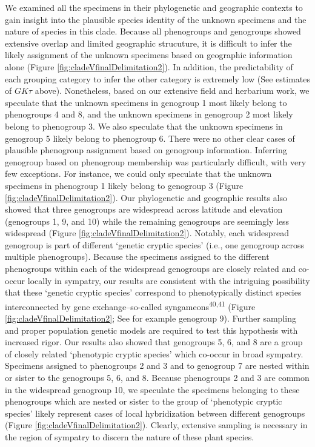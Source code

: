 \documentclass[
  11pt,
]{article}
\begin{document}
We examined all the specimens in their phylogenetic and geographic contexts to gain insight into the plausible species identity of the unknown specimens and the nature of species in this clade. Because all phenogroups and genogroups showed extensive overlap and limited geographic strucuture, it is difficult to infer the likely assignment of the unknown specimens based on geographic information alone (Figure \ref{fig:cladeVfinalDelimitation2}). In addition, the predictability of each grouping category to infer the other category is extremely low (See estimates of \(GK\tau\) above). Nonetheless, based on our extensive field and herbarium work, we speculate that the unknown specimens in genogroup 1 most likely belong to phenogroups 4 and 8, and the unknown specimens in genogroup 2 most likely belong to phenogroup 3. We also speculate that the unknown specimens in genogroup 5 likely belong to phenogroup 6. There were no other clear cases of plausible phenogroup assignment based on genogroup information. Inferring genogroup based on phenogroup membership was particularly difficult, with very few exceptions. For instance, we could only speculate that the unknown specimens in phenogroup 1 likely belong to genogroup 3 (Figure \ref{fig:cladeVfinalDelimitation2}). Our phylogenetic and geographic results also showed that three genogroups are widespread across latitude and elevation (genogroups 1, 9, and 10) while the remaining genogroups are seemingly less widespread (Figure \ref{fig:cladeVfinalDelimitation2}). Notably, each widespread genogroup is part of different `genetic cryptic species' (i.e., one genogroup across multiple phenogroups). Because the specimens assigned to the different phenogroups within each of the widespread genogroups are closely related and co-occur locally in sympatry, our results are consistent with the intriguing possibility that these `genetic cryptic species' correspond to phenotypically distinct species interconnected by gene exchange--so-called syngameons\textsuperscript{40,41} (Figure \ref{fig:cladeVfinalDelimitation2}; See for example genogroup 9). Further sampling and proper population genetic models are required to test this hypothesis with increased rigor. Our results also showed that genogroups 5, 6, and 8 are a group of closely related `phenotypic cryptic species' which co-occur in broad sympatry. Specimens assigned to phenogroups 2 and 3 and to genogroup 7 are nested within or sister to the genogroups 5, 6, and 8. Because phenogroups 2 and 3 are common in the widespread genogroup 10, we speculate the specimens belonging to these phenogroups which are nested or sister to the group of `phenotypic cryptic species' likely represent cases of local hybridization between different genogroups (Figure \ref{fig:cladeVfinalDelimitation2}). Clearly, extensive sampling is necessary in the region of sympatry to discern the nature of these plant species.
\end{document}
